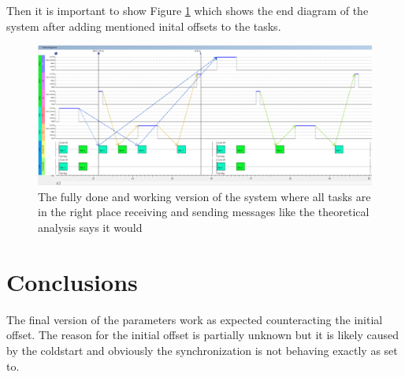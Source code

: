 Then it is important to show Figure \ref{fig:FRdiagram} which shows the end diagram of the system after adding mentioned inital offsets to the tasks.
\begin{figure}[h!]
	\begin{center}
		\includegraphics[width=0.9\linewidth]{img/FR-state-Diagram}
		\caption{The fully done and working version of the system where all tasks are in the right place receiving and sending messages like the theoretical analysis says it would}
		\label{fig:FRdiagram}
	\end{center}
\end{figure}

\section{Conclusions}

The final version of the parameters work as expected counteracting the initial offset. The reason for the initial offset is partially unknown but it is likely caused by the coldstart and obviously the synchronization is not behaving exactly as set to.